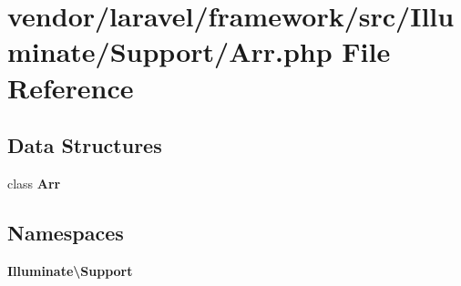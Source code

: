 \section{vendor/laravel/framework/src/\+Illuminate/\+Support/\+Arr.php File Reference}
\label{_arr_8php}
\subsection*{Data Structures}
\begin{DoxyCompactItemize}
\item 
class {\bf Arr}
\end{DoxyCompactItemize}
\subsection*{Namespaces}
\begin{DoxyCompactItemize}
\item 
 {\bf Illuminate\textbackslash{}\+Support}
\end{DoxyCompactItemize}
